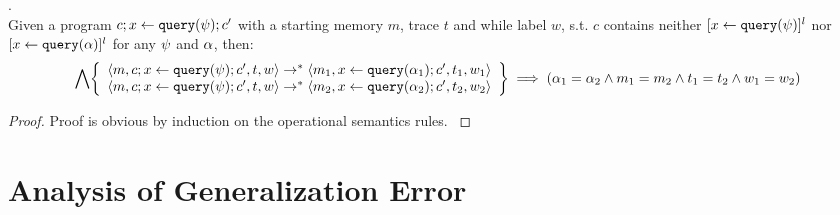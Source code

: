 \documentclass[a4paper,11pt]{article}
\begin{document}
%
%
\begin{lem}
.
\label{lem:querysemidetrm}
\\
{
Given a program $c; \mathrel{ x \leftarrow {\tt query}(\psi) }; c'$ with a starting memory $m$, trace $t$ and while label $w$, 
s.t. $c$ contains neither  
$[\mathrel{ x \leftarrow {\tt query}(\psi) }]^l$ nor $[\mathrel{ x \leftarrow {\tt query}(\alpha) }]^l$ for any $\psi$ and $\alpha$, then:
%
\[
\bigwedge
\left\{
\begin{array}{l}
\config{m, c; \assign{x}{\query(\qexpr)}; c', t, w} 
\rightarrow^{*} 
\config{m_1, \assign{x}{\query(\qval_1)}; c', t_1, w_1} 
\\
\config{m, c; \assign{x}{\query(\qexpr)}; c', t, w} 
\rightarrow^{*} 
\config{m_2, \assign{x}{\query(\qval_2)}; c', t_2, w_2} 
\end{array}
\right\}
\implies
(\qval_1 = \qval_2 \land m_1 = m_2 \land t_1 = t_2 \land w_1 = w_2)
\]
}
\end{lem}
%
\begin{proof}
{
Proof is obvious by induction on the operational semantics rules.
}
\end{proof}
\section{Analysis of Generalization Error}
\end{document}
